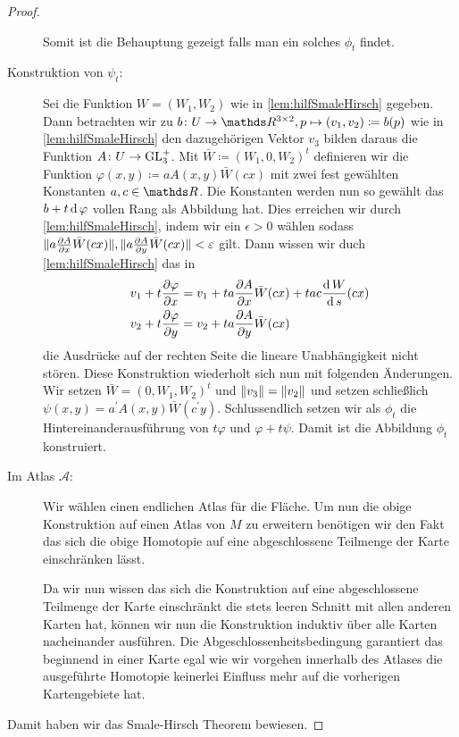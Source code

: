 \begin{Thm}
\begin{proof}
\begin{description}
			  Somit ist die Behauptung gezeigt falls man ein solches $ \phi_t $
			  findet. 
			  
			  \item[Konstruktion von $ \psi_t $:] Sei die Funktion $ W=(W_1,W_2) $ wie in \cref{lem:hilfSmaleHirsch} gegeben. Dann 
			  betrachten wir zu $ \abb{b}{U}{\R^{3\times 2}} , p\mapsto (v_1,v_2) \coloneqq b(p) $ wie in \cref{lem:hilfSmaleHirsch}
			  den dazugehörigen Vektor $ v_3 $ bilden daraus die Funktion
			  $ A \colon U \rightarrow \operatorname{GL}_3^+ $. Mit $ \bar{W}\coloneqq (W_1,0,W_2)^t$ 
			  definieren wir die Funktion $ \varphi(x,y)\coloneqq aA(x,y)\bar{W}(cx) $ mit zwei fest gewählten Konstanten $ a,c\in\R $. Die Konstanten werden nun so gewählt das
			  $ b + t\operatorname{d} \varphi $ vollen Rang als Abbildung hat. Dies 
			  erreichen wir durch \cref{lem:hilfSmaleHirsch}, indem 
			  wir ein $ \epsilon > 0 $ wählen sodass $ \lVert a \frac{\partial A}{\partial x} \bar{W}(cx)\rVert,\lVert a \frac{\partial A}{\partial y}\bar{W}(cx)\rVert < \varepsilon $ gilt. Dann wissen wir duch \cref{lem:hilfSmaleHirsch} das in
			  \begin{align*}
			  	v_1 + t \frac{\partial \varphi}{\partial x} &= v_1 + ta\frac{\partial A}{\partial x} \bar{W}(cx) + tac\frac{\operatorname{d} W}{\operatorname{d} s}(cx) \\
			  	v_2 + t \frac{\partial \varphi}{\partial y} &= v_2 + ta \frac{\partial A}{\partial y} \bar{W}(cx)
			  \end{align*}
			  die Ausdrücke auf der rechten Seite die lineare Unabhängigkeit
			  nicht stören.
			  Diese Konstruktion wiederholt sich nun mit folgenden Änderungen.
			  Wir setzen $ \bar{W}=(0,W_1,W_2)^t $ und $ \lVert v_3\rVert=\lVert v_2\rVert $ und setzen schließlich $ \psi(x,y) = a^{'}A(x,y)\bar{W}(c^{'}y) $. 
			  Schlussendlich setzen wir als $ \phi_t $ die Hintereinanderausführung von $ t\varphi $ und $ \varphi + t\psi $. Damit ist die Abbildung $ \phi_t $ konstruiert.
			  
			\item[Im Atlas $ \mathcal{A} $:] 
			Wir wählen einen endlichen Atlas für die Fläche.
			Um nun die obige Konstruktion auf einen Atlas von $ M $ zu erweitern
			benötigen wir den Fakt das sich die obige Homotopie
			auf eine abgeschlossene Teilmenge der Karte einschränken
			lässt. 
			
			Da wir nun wissen das sich die Konstruktion auf eine
			abgeschlossene Teilmenge der Karte einschränkt die
			stets leeren Schnitt mit allen anderen Karten hat, können
			wir nun die Konstruktion induktiv über alle Karten
			nacheinander ausführen. Die Abgeschlossenheitsbedingung
			garantiert das beginnend in einer Karte egal wie wir
			vorgehen innerhalb des Atlases die ausgeführte Homotopie
			keinerlei Einfluss mehr auf die vorherigen Kartengebiete hat.
			\end{description}
			Damit haben wir das Smale-Hirsch Theorem bewiesen.
	\end{proof}
	
\end{Thm}

